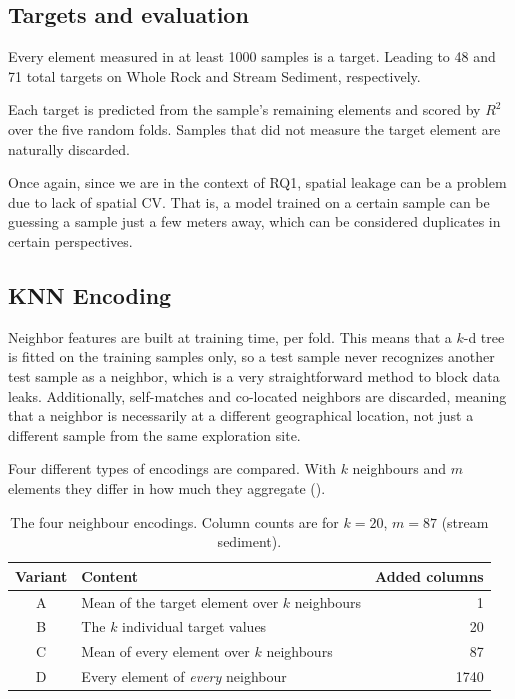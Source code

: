 \documentclass[
    a4paper,
    11pt,
    oneside,
    numbers=noendperiod,
    abstract=true
]{scrartcl}
\newcommand{\Rsq}{$R^2$}
\begin{document}
\subsection{Targets and evaluation}
\label{sec:evaluation}

Every element measured in at least \num{1000} samples is a target. Leading to 48 and 71 total targets on Whole Rock and Stream Sediment, respectively.

Each target is predicted from the sample's remaining elements and scored by \Rsq{} over the five random folds. Samples that did not measure the target element are naturally discarded.

Once again, since we are in the context of RQ1, spatial leakage can be a problem due to lack of spatial CV. That is, a model trained on a certain sample can be guessing a sample just a few meters away, which can be considered duplicates in certain perspectives.

\subsection{KNN Encoding}
\label{sec:neighbours}

Neighbor features are built at training time, per fold. This means that a $k$-d tree is fitted on the training samples only, so a test sample never recognizes another test sample as a neighbor, which is a very straightforward method to block data leaks. Additionally, self-matches and co-located neighbors are discarded, meaning that a neighbor is necessarily at a different geographical location, not just a different sample from the same exploration site.

Four different types of encodings are compared. 
With $k$ neighbours and $m$ elements they differ in how much they aggregate ().

\begin{table}[htbp]
\centering
\caption[The four neighbour encodings]{The four neighbour encodings. Column counts are for
$k=20$, $m=87$ (stream sediment).}
\label{tab:encodings}
\begin{tabular}{clr}
\toprule
Variant & Content & Added columns \\
\midrule
A & Mean of the target element over $k$ neighbours & 1 \\
B & The $k$ individual target values               & 20 \\
C & Mean of every element over $k$ neighbours      & 87 \\
D & Every element of \emph{every} neighbour        & \num{1740} \\
\bottomrule
\end{tabular}
\end{table}
\end{document}

